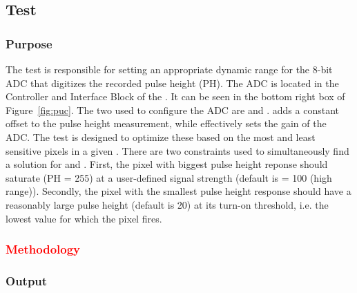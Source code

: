
\newpage

\subsection{\phopt Test}
\label{ss:phoptimization}

\subsubsection{Purpose}

The \phopt test is responsible for setting an appropriate dynamic range for the 8-bit ADC that digitizes the recorded pulse height (PH).
The ADC is located in the Controller and Interface Block of the \roc.
It can be seen in the bottom right box of Figure~\ref{fig:puc}.
The two \dacs used to configure the ADC are \phoffset and \phscale.
\phoffset adds a constant offset to the pulse height measurement,
while \phscale effectively sets the gain of the ADC.
The \phopt test is designed to optimize these \dacs based on the most and least sensitive pixels in a given \roc.
There are two constraints used to simultaneously find a solution for \phoffset and \phscale.
First, the pixel with biggest pulse height reponse should saturate (PH = 255) at a user-defined signal strength
(default is \vcal = 100 (high range)).
Secondly, the pixel with the smallest pulse height response should have a reasonably large pulse height
(default is 20) at its \vcal turn-on threshold,
i.e. the lowest \vcal value for which the pixel fires.

\subsubsection{\textcolor{red}{Methodology}}
\subsubsection{Output}


